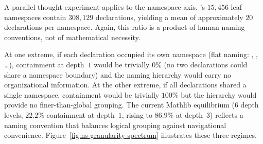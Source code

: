 A parallel thought experiment applies to the namespace axis. 's $15{,}456$ leaf namespaces contain $308{,}129$ declarations, yielding a mean of approximately $20$ declarations per namespace. Again, this ratio is a product of human naming conventions, not of mathematical necessity.

At one extreme, if each declaration occupied its own namespace (flat naming: , , \ldots), containment at depth~$1$ would be trivially $0\%$ (no two declarations could share a namespace boundary) and the naming hierarchy would carry no organizational information. At the other extreme, if all declarations shared a single namespace, containment would be trivially $100\%$ but the hierarchy would provide no finer-than-global grouping. The current Mathlib equilibrium ($6$ depth levels, $22.2\%$ containment at depth~$1$, rising to $86.9\%$ at depth~$3$) reflects a naming convention that balances logical grouping against navigational convenience. Figure~\ref{fig:ns-granularity-spectrum} illustrates these three regimes.

